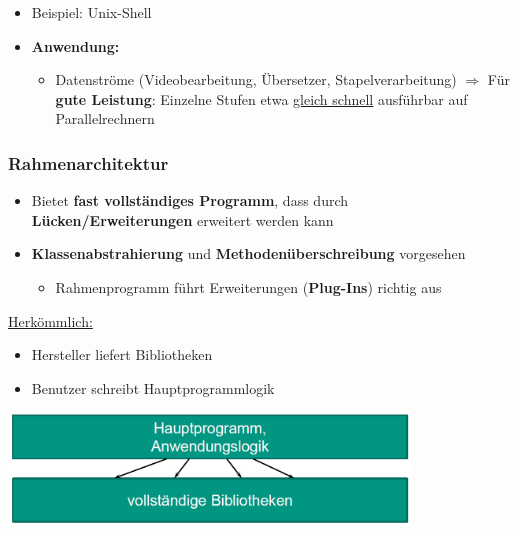 			\begin{itemize}
				\item Beispiel: Unix-Shell
				\item \textbf{Anwendung:}
				\begin{itemize}
					\item Datenströme (Videobearbeitung, Übersetzer, Stapelverarbeitung)
					$\Rightarrow$ Für \textbf{gute Leistung}: Einzelne Stufen etwa \underline{gleich schnell} ausführbar auf Parallelrechnern
				\end{itemize}
			\end{itemize}
			
		\subsubsection{Rahmenarchitektur}
					
			\begin{itemize}
				\item Bietet \textbf{fast vollständiges Programm}, dass durch \textbf{Lücken/Erweiterungen} erweitert werden kann
				\item \textbf{Klassenabstrahierung} und \textbf{Methodenüberschreibung} vorgesehen
				\begin{itemize}
					\item Rahmenprogramm führt Erweiterungen (\textbf{Plug-Ins}) richtig aus
				\end{itemize}
			\end{itemize}
						
			\underline{Herkömmlich:}
			\begin{itemize}
				\item Hersteller liefert Bibliotheken
				\item Benutzer schreibt Hauptprogrammlogik
			\end{itemize}				
			\begin{center}
				\includegraphics[width=0.8\textwidth]{../resources/images/rahmenarchitekturHerkoemmlich.png}
			\end{center}
				
